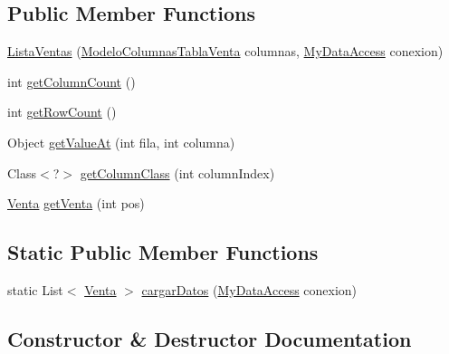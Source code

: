 \subsection*{Public Member Functions}
\begin{DoxyCompactItemize}
\item 
\mbox{\hyperlink{classventa_1_1_lista_ventas_a69da326fde1b9ceea242d38147016528}{Lista\+Ventas}} (\mbox{\hyperlink{classventa_1_1_modelo_columnas_tabla_venta}{Modelo\+Columnas\+Tabla\+Venta}} columnas, \mbox{\hyperlink{classconexion_s_q_l_1_1_my_data_access}{My\+Data\+Access}} conexion)
\item 
int \mbox{\hyperlink{classventa_1_1_lista_ventas_a4c846805ce96ed90b2dc1228a2fc82c7}{get\+Column\+Count}} ()
\item 
int \mbox{\hyperlink{classventa_1_1_lista_ventas_a6c9b22b51a3571a01462073c6272cf0b}{get\+Row\+Count}} ()
\item 
Object \mbox{\hyperlink{classventa_1_1_lista_ventas_a49bbca6b55f15602ea06e0401ae84792}{get\+Value\+At}} (int fila, int columna)
\item 
Class$<$?$>$ \mbox{\hyperlink{classventa_1_1_lista_ventas_a285fad7c683f620c9320ee9d430975bd}{get\+Column\+Class}} (int column\+Index)
\item 
\mbox{\hyperlink{classventa_1_1_venta}{Venta}} \mbox{\hyperlink{classventa_1_1_lista_ventas_ae3dd8941eee7b0e14309add4764d3d1a}{get\+Venta}} (int pos)
\end{DoxyCompactItemize}
\subsection*{Static Public Member Functions}
\begin{DoxyCompactItemize}
\item 
static List$<$ \mbox{\hyperlink{classventa_1_1_venta}{Venta}} $>$ \mbox{\hyperlink{classventa_1_1_lista_ventas_a5addbb3cc5ae30ddd938cc5ae3021a48}{cargar\+Datos}} (\mbox{\hyperlink{classconexion_s_q_l_1_1_my_data_access}{My\+Data\+Access}} conexion)
\end{DoxyCompactItemize}


\subsection{Constructor \& Destructor Documentation}
\mbox{\label{classventa_1_1_lista_ventas_a69da326fde1b9ceea242d38147016528}} 
